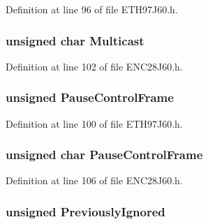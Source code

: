 Definition at line 96 of file E\+T\+H97\+J60.\+h.

\hypertarget{union_r_x_s_t_a_t_u_s_af1db8263c2237487c1065633cf2cc925}{}
\subsubsection[{Multicast}]{\setlength{\rightskip}{0pt plus 5cm}unsigned char Multicast}\label{union_r_x_s_t_a_t_u_s_af1db8263c2237487c1065633cf2cc925}


Definition at line 102 of file E\+N\+C28\+J60.\+h.

\hypertarget{union_r_x_s_t_a_t_u_s_a04f9ce3d2d7945030381a0174a8367a8}{}
\subsubsection[{Pause\+Control\+Frame}]{\setlength{\rightskip}{0pt plus 5cm}unsigned Pause\+Control\+Frame}\label{union_r_x_s_t_a_t_u_s_a04f9ce3d2d7945030381a0174a8367a8}


Definition at line 100 of file E\+T\+H97\+J60.\+h.

\hypertarget{union_r_x_s_t_a_t_u_s_a8daa2093b6ecdd4c42abc160f683bbc2}{}
\subsubsection[{Pause\+Control\+Frame}]{\setlength{\rightskip}{0pt plus 5cm}unsigned char Pause\+Control\+Frame}\label{union_r_x_s_t_a_t_u_s_a8daa2093b6ecdd4c42abc160f683bbc2}


Definition at line 106 of file E\+N\+C28\+J60.\+h.

\hypertarget{union_r_x_s_t_a_t_u_s_ad5b358b232a75e9c5d51b969589500b7}{}
\subsubsection[{Previously\+Ignored}]{\setlength{\rightskip}{0pt plus 5cm}unsigned Previously\+Ignored}\label{union_r_x_s_t_a_t_u_s_ad5b358b232a75e9c5d51b969589500b7}


